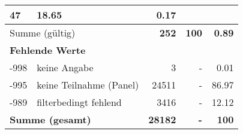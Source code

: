 \begin{longtable}{lXrrr}
       \num{47} &
       \num[round-mode=places,round-precision=2]{18.65} &
         \num[round-mode=places,round-precision=2]{0.17} \\
     \midrule
     \multicolumn{2}{l}{Summe (gültig)} &
       \textbf{\num{252}} &
     \textbf{100} &
       \textbf{\num[round-mode=places,round-precision=2]{0.89}} \\
     \multicolumn{5}{l}{\textbf{Fehlende Werte}}\\
       -998 &
       keine Angabe &
         \num{3} &
        - &
         \num[round-mode=places,round-precision=2]{0.01} \\
       -995 &
       keine Teilnahme (Panel) &
         \num{24511} &
        - &
         \num[round-mode=places,round-precision=2]{86.97} \\
       -989 &
       filterbedingt fehlend &
         \num{3416} &
        - &
         \num[round-mode=places,round-precision=2]{12.12} \\
     \midrule
     \multicolumn{2}{l}{\textbf{Summe (gesamt)}} &
          \textbf{\num{28182}} &
        \textbf{-} &
        \textbf{100} \\
     \bottomrule
     \end{longtable}
     
